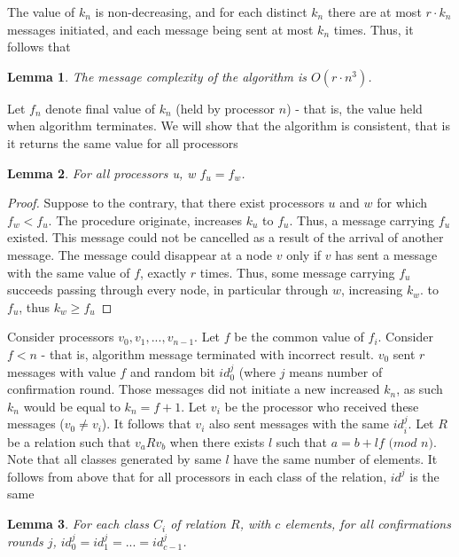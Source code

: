 \documentclass{article}
\newtheorem{lemma}{Lemma}
\begin{document}
The value of $k_n$ is non-decreasing, and for each distinct $k_n$ there are at most $r \cdot k_n$ messages initiated, and each message being sent at most $k_n$ times. Thus, it follows that

\begin{lemma}
The message complexity of the algorithm is $O(r \cdot n^3)$.
\end{lemma}

Let $f_n$ denote final value of $k_n$ (held by processor $n$) - that is, the value held when algorithm terminates. We will show that the algorithm is consistent, that is it returns the same value for all processors

\begin{lemma}
For all processors u, w $f_u = f_w$.
\end{lemma}

\begin{proof} \cite{ItaiRodeh1990}
Suppose to the contrary, that there exist processors $u$ and $w$ for
which $f_w < f_u$. The procedure originate, increases $k_u$ to $f_u$. Thus, a message carrying $f_u$ existed. This message could not be cancelled as a result of the arrival of another message. The message could disappear at a node $v$ only if $v$ has sent a message with the same value of $f$, exactly $r$ times. Thus, some message carrying $f_u$ succeeds passing through every node, in particular through $w$, increasing $k_w$. to $f_u$, thus $k_w \geq f_u$
\end{proof}

Consider processors $v_0, v_1, ..., v_{n-1}$. Let $f$ be the common value of $f_i$. Consider $f < n$ - that is, algorithm message terminated with incorrect result. $v_0$ sent $r$ messages with value $f$ and random bit $id^j_0$ (where $j$ means number of confirmation round. Those messages did not initiate a new increased $k_n$, as such $k_n$ would be equal to $k_n = f + 1$. Let $v_i$ be the processor who received these messages ($v_0 \neq v_i$). It follows that $v_i$ also sent messages with the same $id^j_i$. Let $R$ be a relation such that $v_a R v_b$ when there exists $l$ such that $a = b + l f$  $(mod$ $n)$. Note that all classes generated by same $l$ have the same number of elements. It follows from above that for all processors in each class of the relation, $id^j$ is the same

\begin{lemma}
For each class $C_i$ of relation $R$, with $c$ elements, for all confirmations rounds $j$, $id^j_0 = id^j_1 = ... = id^j_{c-1}$.
\end{lemma}
\end{document}
